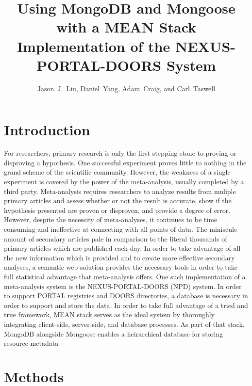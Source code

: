 \documentclass[10pt,twocolumn,twoside]{article}
\date{} %
\author{Jason~J.~Liu, Daniel~Yang, Adam~Craig, and Carl~Taswell}
\title{Using MongoDB and Mongoose with a MEAN Stack Implementation of the NEXUS-PORTAL-DOORS System\\ }
\begin{document}
\maketitle
\thispagestyle{empty}

\section*{Introduction}
\label{secIntroduction}
	For researchers, primary research is only the first stepping stone to proving or disproving a hypothesis. One successful experiment proves little to nothing in the grand scheme of the scientific community. However, the weakness of a single experiment is covered by the power of the meta-analysis, usually completed by a third party. Meta-analysis requires researchers to analyze results from muliple primary articles and assess whether or not the result is accurate, show if the hypothesis presented are proven or disproven, and provide a degree of error. However, despite the necessity of meta-analyses, it continues to be time consuming and ineffective at connecting with all points of data. The miniscule amount of secondary articles pale in comparison to the literal thousands of primary articles which are published each day. In order to take advantage of all the new information which is provided and to create more effective secondary analyses, a semantic web solution provides the necessary tools in order to take full statistical advantage that meta-analysis offers. 
 \newline
	One such implementation of a meta-analysis system is the NEXUS-PORTAL-DOORS (NPD) system. In order to support PORTAL registries and DOORS directories, a database is necessary in order to support and store the data. In order to take full advantage of a tried and true framework, MEAN stack serves as the ideal system by thoroughly integrating client-side, server-side, and database processes. As part of that stack, MongoDB alongside Mongoose enables a heirarchical database for storing resource metadata 

\section*{Methods}

\label{secMethods}

\end{document}
